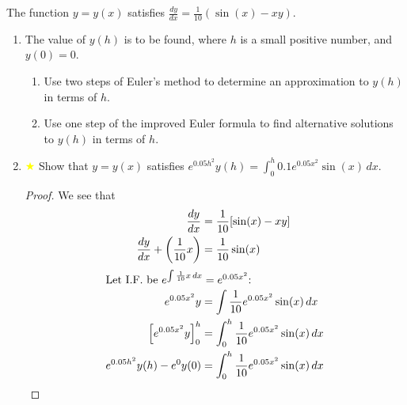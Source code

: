 \documentclass[oneside]{book}
\begin{document}
\begin{example}{}{}
  The function \(y=y(x)\) satisfies \(\frac{dy}{dx}=\frac{1}{10}(\sin(x)-xy)\). 
  \begin{enumerate}[label=(\roman*)]
    \item The value of \(y(h)\) is to be found, where \(h\) is a small positive number, and \(y(0)=0\).
    \begin{enumerate}
      \item Use two steps of Euler's method to determine an approximation to \(y(h)\) in terms of \(h\).
      \item Use one step of the improved Euler formula to find alternative solutions to \(y(h)\) in terms of \(h\).
    \end{enumerate}
    \item \textcolor{yellow}{\(\bigstar\)} Show that \(y=y(x)\) satisfies \(e^{0.05h^2}y(h)=\int_{0}^{h}0.1e^{0.05x^2}\sin(x)\,dx\).
    \begin{proof}
      We see that
      \begin{align*}
        \frac{dy}{dx}&=\frac{1}{10}[\sin(x)-xy]\\
        \frac{dy}{dx}+\left( \frac{1}{10}x \right)&=\frac{1}{10}\sin(x)\\
        \intertext{Let I.F. be \(e^{\int\frac{1}{10}x\,dx}=e^{0.05x^2}\):}
        e^{0.05x^2}y&=\int\frac{1}{10}e^{0.05x^2}\sin(x)\,dx\\
        \left[e^{0.05x^2}y\right]_{0}^{h}&=\int_{0}^{h}\frac{1}{10}e^{0.05x^2}\sin(x)\,dx\\
        e^{0.05h^2}y(h)-e^0y(0)&=\int_{0}^{h}\frac{1}{10}e^{0.05x^2}\sin(x)\,dx\\

\end{align*}
\end{proof}
\end{enumerate}
\end{example}
\end{document}
